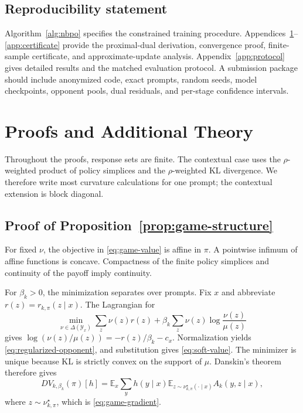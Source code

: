 \documentclass{article}
\theoremstyle{remark}
\theoremstyle{plain}
\newcommand{\Y}{\mathcal{Y}}
\newcommand{\E}{\mathbb{E}}
\begin{document}
\subsection*{Reproducibility statement}
Algorithm~\ref{alg:nbpo} specifies the constrained training procedure. Appendices~\ref{app:proofs}--\ref{app:certificate} provide the proximal-dual derivation, convergence proof, finite-sample certificate, and approximate-update analysis. Appendix~\ref{app:protocol} gives detailed results and the matched evaluation protocol. A submission package should include anonymized code, exact prompts, random seeds, model checkpoints, opponent pools, dual residuals, and per-stage confidence intervals.




\appendix

\section{Proofs and Additional Theory}
\label{app:proofs}
Throughout the proofs, response sets are finite. The contextual case uses the $\rho$-weighted product of policy simplices and the $\rho$-weighted KL divergence. We therefore write most curvature calculations for one prompt; the contextual extension is block diagonal.

\subsection{Proof of Proposition~\ref{prop:game-structure}}
For fixed $\nu$, the objective in \eqref{eq:game-value} is affine in $\pi$. A pointwise infimum of affine functions is concave. Compactness of the finite policy simplices and continuity of the payoff imply continuity.

For $\beta_k>0$, the minimization separates over prompts. Fix $x$ and abbreviate $r(z)=r_{k,\pi}(z\mid x)$. The Lagrangian for
\[
\min_{\nu\in\Delta(\Y_x)}
\sum_z\nu(z)r(z)+\beta_k\sum_z\nu(z)\log\frac{\nu(z)}{\mu(z)}
\]
gives
$\log(\nu(z)/\mu(z))=-r(z)/\beta_k-c_x$.
Normalization yields \eqref{eq:regularized-opponent}, and substitution gives \eqref{eq:soft-value}. The minimizer is unique because KL is strictly convex on the support of $\mu$. Danskin's theorem therefore gives
\[
D V_{k,\beta_k}(\pi)[h]
=
\E_x\sum_y h(y\mid x)\E_{z\sim\nu^\star_{k,\pi}(\cdot\mid x)}A_k(y,z\mid x),
\]
where $z\sim\nu^\star_{k,\pi}$, which is \eqref{eq:game-gradient}.
\end{document}
